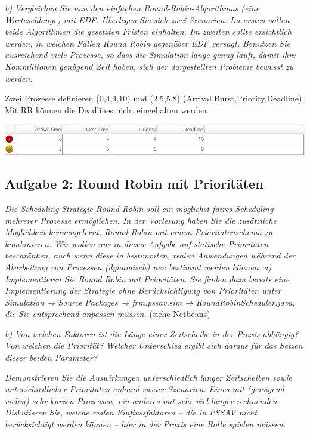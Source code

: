 \documentclass[a4paper]{article}
\begin{document}
\textit{b) Vergleichen Sie nun den einfachen Round-Robin-Algorithmus (eine Warteschlange) mit EDF. Überlegen Sie sich zwei Szenarien: Im ersten sollen beide Algorithmen die gesetzten Fristen einhalten. Im zweiten sollte ersichtlich werden, in welchen Fällen Round Robin gegenüber EDF versagt.
    Benutzen Sie ausreichend viele Prozesse, so dass die Simulation lange genug läuft, damit ihre Kommilitonen genügend Zeit haben, sich der dargestellten Probleme bewusst zu werden.}
\vspace{10mm}

Zwei Prozesse definieren (0,4,4,10) und (2,5,5,8) (Arrival,Burst,Priority,Deadline). Mit RR können die Deadlines nicht eingehalten werden.
\begin{center}
    \includegraphics[width=0.8\linewidth]{Assets/Betriebssystem_uebung/u3_a1.png}
\end{center}

\subsection{Aufgabe 2: Round Robin mit Prioritäten}
\textit{Die Scheduling-Strategie Round Robin soll ein möglichst faires Scheduling mehrerer Prozesse ermöglichen. In der Vorlesung haben Sie die zusätzliche Möglichkeit kennengelernt, Round Robin mit einem Prioritätenschema zu kombinieren. Wir wollen uns in dieser Aufgabe auf statische Prioritäten beschränken, auch wenn diese in bestimmten, realen Anwendungen während der Abarbeitung von Prozessen (dynamisch) neu bestimmt werden können.}
\vspace{10mm}
\textit{a) Implementieren Sie Round Robin mit Prioritäten. Sie finden dazu bereits eine Implementierung der Strategie ohne Berücksichtigung von Prioritäten unter Simulation → Source Packages → frm.pssav.sim → RoundRobinScheduler.java, die Sie entsprechend anpassen müssen.}
\vspace{10mm}
(siehe Netbeans)

\textit{b) Von welchen Faktoren ist die Länge einer Zeitscheibe in der Praxis abhängig? Von welchen die Priorität? Welcher Unterschied ergibt sich daraus für das Setzen dieser beiden Parameter?}
\vspace{10mm}

\textit{Demonstrieren Sie die Auswirkungen unterschiedlich langer Zeitscheiben sowie unterschiedlicher Prioritäten anhand zweier Szenarien: Eines mit (genügend vielen) sehr kurzen Prozessen, ein anderes mit sehr viel länger rechnenden. Diskutieren Sie, welche realen Einflussfaktoren – die in PSSAV nicht berücksichtigt werden können – hier in der Praxis eine Rolle spielen müssen.}
\end{document}
